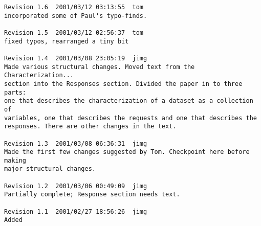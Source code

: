 \documentclass{article}
\begin{document}
\begin{verbatim}
Revision 1.6  2001/03/12 03:13:55  tom
incorporated some of Paul's typo-finds.

Revision 1.5  2001/03/12 02:56:37  tom
fixed typos, rearranged a tiny bit

Revision 1.4  2001/03/08 23:05:19  jimg
Made various structural changes. Moved text from the Characterization...
section into the Responses section. Divided the paper in to three parts:
one that describes the characterization of a dataset as a collection of
variables, one that describes the requests and one that describes the
responses. There are other changes in the text.

Revision 1.3  2001/03/08 06:36:31  jimg
Made the first few changes suggested by Tom. Checkpoint here before making
major structural changes.

Revision 1.2  2001/03/06 00:49:09  jimg
Partially complete; Response section needs text.

Revision 1.1  2001/02/27 18:56:26  jimg
Added
\end{verbatim}
\end{document}

